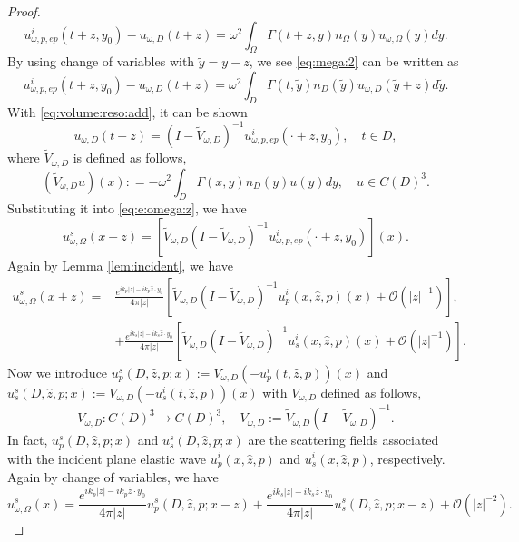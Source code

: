 \documentclass[a4paper,11pt]{article}
\theoremstyle{remark}
\theoremstyle{definition}
\numberwithin{equation}{section}
\begin{document}
\begin{proof}
\begin{equation}
u_{\omega,p,ep}^{i}(t+z,y_0)-u_{\omega,D}(t+z)=\omega^2 \int_{\Omega}\Gamma(t+z,y)n_{\Omega}(y)u_{\omega, \Omega}(y)dy.
\end{equation}
By using change of variables with $\tilde y = y-z$, we see \eqref{eq:mega:2} can be written as
\begin{equation}\label{eq:volume:reso:add}
u_{\omega,p,ep}^{i}(t+z,y_0)-u_{\omega,D}(t+z)=\omega^2 \int_{D}\Gamma(t,\tilde y)n_{D}(\tilde y)u_{\omega,D}(\tilde y +z)d\tilde y.
\end{equation}
With \eqref{eq:volume:reso:add}, it can be shown
\begin{equation*}
u_{\omega,D}(t+z) = (I - \tilde{V}_{\omega,D})^{-1}u_{\omega,p,ep}^{i}(\cdot+z,y_0), \quad t \in D,
\end{equation*}
where $\tilde{V}_{\omega,D}$ is defined as follows,
\begin{equation}\label{eq:volume:p:D}
(\tilde{V}_{\omega,D} u)(x): = -\omega^2\int_{D} \Gamma(x,y) n_{D}(y) u(y)dy, \quad u \in C(D)^3.
\end{equation}
Substituting it into \eqref{eq:e:omega:z}, we have
\begin{equation*}
u_{\omega,\Omega}^s(x+z)  =  [\tilde{V}_{\omega,D} (I - \tilde{V}_{\omega,D})^{-1}u_{\omega,p,ep}^{i}(\cdot+z,y_0)](x).
\end{equation*}
Again by Lemma \ref{lem:incident}, we have
\begin{align}
u_{\omega,\Omega}^s(x+z)  =&  \frac{e^{ik_p|z|-ik_p\hat{z} \cdot y_0}}{4 \pi |z|}[\tilde{V}_{\omega,D} (I - \tilde{V}_{\omega,D})^{-1}u_{p}^{i}(x,\hat{z},p)(x) + \mathcal{O}(|z|^{-1})], \label{eq:aym:me:1} \\
& +\frac{e^{ik_s|z|-ik_s\hat{z} \cdot y_0}}{4 \pi |z|}[\tilde{V}_{\omega,D} (I - \tilde{V}_{\omega,D})^{-1}u_{s}^{i}(x,\hat{z},p)(x) + \mathcal{O}(|z|^{-1})]. \label{eq:aym:me:2}
\end{align}
 Now we introduce $u_{p}^{s}(D, \hat{z},p;x) := V_{\omega,D}(- u_{p}^{i}(t,\hat{z},p))(x)$ and $u_{s}^{s}(D, \hat{z},p;x) := V_{\omega,D}(-u_{s}^{i}(t,\hat{z},p))(x)$ with $V_{\omega,D}$ defined as follows,
    \[
    V_{\omega,D} : C(D)^3 \rightarrow C(D)^3, \quad V_{\omega,D} := \tilde{V}_{\omega,D} (I - \tilde{V}_{\omega,D})^{-1}.
    \]
    In fact, $u_{p}^{s}(D, \hat{z},p;x)$ and $u_{s}^{s}(D, \hat{z},p;x)$ are the scattering fields associated with the incident plane elastic wave $u_{p}^i(x, \hat{z},p)$ and $u_{s}^i(x, \hat{z},p)$, respectively.
Again by change of variables, we have
\begin{equation}\label{eq:medium:syste}
u_{\omega,\Omega}^s(x) = \frac{e^{ik_p|z|-ik_p\hat{z} \cdot y_0}}{4 \pi |z|}u_{p}^s(D,\hat{z},p;{x-z})+\frac{e^{ik_s|z|-ik_s\hat{z} \cdot y_0}}{4 \pi |z|}u_{s}^s(D,\hat{z},p;{x-z})+ \mathcal{O}(|z|^{-2}).
\end{equation}
\end{proof}
\end{document}
